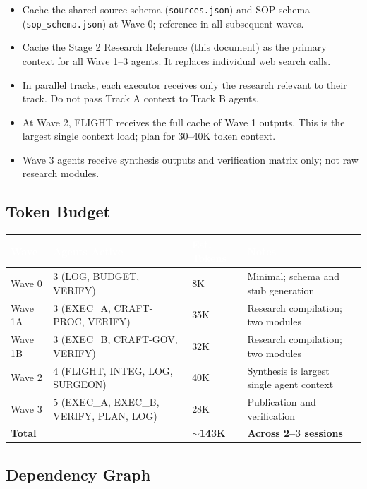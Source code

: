 \documentclass[11pt,letterpaper]{article}
\newcommand{\tableheader}[1]{\textbf{\sffamily\textcolor{white}{#1}}}
\begin{document}
\begin{itemize}[leftmargin=1.5em]
  \item Cache the shared source schema (\texttt{sources.json}) and SOP schema (\texttt{sop\_schema.json}) at Wave 0; reference in all subsequent waves.
  \item Cache the Stage 2 Research Reference (this document) as the primary context for all Wave 1--3 agents. It replaces individual web search calls.
  \item In parallel tracks, each executor receives only the research relevant to their track. Do not pass Track A context to Track B agents.
  \item At Wave 2, FLIGHT receives the full cache of Wave 1 outputs. This is the largest single context load; plan for 30--40K token context.
  \item Wave 3 agents receive synthesis outputs and verification matrix only; not raw research modules.
\end{itemize}

\subsection{Token Budget}

\begin{center}
\begin{tabularx}{\textwidth}{L{3cm}L{3cm}L{2.5cm}X}
\toprule
{}
\tableheader{Wave} & \tableheader{Agents Active} & \tableheader{Est. Tokens} & \tableheader{Notes} \\
\midrule
Wave 0 & 3 (LOG, BUDGET, VERIFY) & 8K & Minimal; schema and stub generation \\
Wave 1A & 3 (EXEC\_A, CRAFT-PROC, VERIFY) & 35K & Research compilation; two modules \\
Wave 1B & 3 (EXEC\_B, CRAFT-GOV, VERIFY) & 32K & Research compilation; two modules \\
Wave 2 & 4 (FLIGHT, INTEG, LOG, SURGEON) & 40K & Synthesis is largest single agent context \\
Wave 3 & 5 (EXEC\_A, EXEC\_B, VERIFY, PLAN, LOG) & 28K & Publication and verification \\
\midrule
\textbf{Total} & & \textbf{$\sim$143K} & \textbf{Across 2--3 sessions} \\
\bottomrule
\end{tabularx}
\end{center}

\subsection{Dependency Graph}
\end{document}
